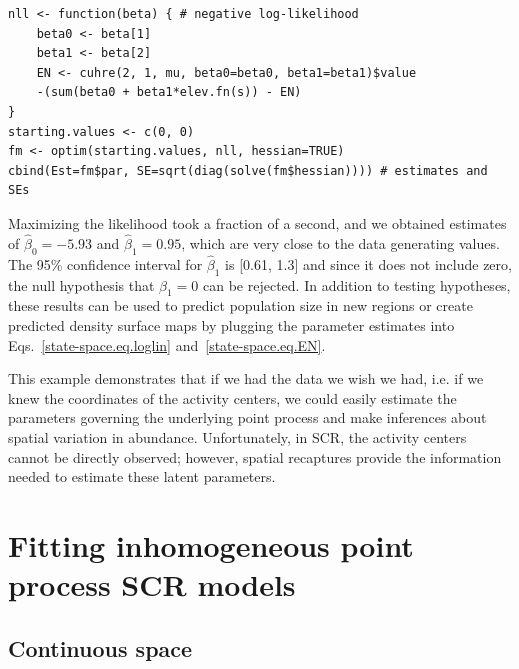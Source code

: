 \begin{small}
\begin{verbatim}
nll <- function(beta) { # negative log-likelihood
    beta0 <- beta[1]
    beta1 <- beta[2]
    EN <- cuhre(2, 1, mu, beta0=beta0, beta1=beta1)$value
    -(sum(beta0 + beta1*elev.fn(s)) - EN)
}
starting.values <- c(0, 0)
fm <- optim(starting.values, nll, hessian=TRUE)
cbind(Est=fm$par, SE=sqrt(diag(solve(fm$hessian)))) # estimates and SEs
\end{verbatim}
\end{small}

Maximizing the likelihood took a fraction of a second, and we
obtained estimates of $\hat{\beta}_0=-5.93$ and $\hat{\beta}_1=0.95$,
which are very close to the data generating values. The 95\% confidence
interval for $\hat{\beta}_1$ is [0.61, 1.3] and since it does not
include zero, the null hypothesis that $\beta_1=0$ can be rejected. In addition to testing
hypotheses, these results can be used to predict population size in
new regions or create predicted density surface maps by plugging the
parameter estimates into Eqs.~\ref{state-space.eq.loglin} and~\ref{state-space.eq.EN}.

This example demonstrates
that if we had the data we wish we had, i.e. if we knew the
coordinates of the activity centers, we could easily estimate the
parameters governing the underlying point process and make inferences
about spatial variation in abundance. Unfortunately, in
SCR, the activity centers cannot be directly observed; however,
spatial recaptures provide the information needed to
estimate these latent parameters.

\section{Fitting inhomogeneous point process SCR models}

\subsection{Continuous space}


